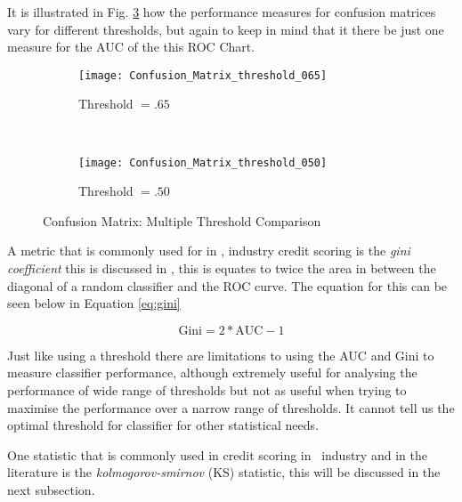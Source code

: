 It is illustrated in Fig. \ref{fig:matric_compare} how the performance measures for confusion matrices vary for different thresholds, but again to keep in mind that it there be just one measure for the AUC of the this ROC Chart.   

\begin{figure}[H]
	\centering
	\begin{subfigure}[b]{0.45\textwidth}
		\captionsetup{font=scriptsize}
		\texttt{[image: Confusion\_Matrix\_threshold\_065]}
		\caption{Threshold $=.65$}\label{fig:Threshold65}
	\end{subfigure} ~\quad
	\begin{subfigure}[b]{0.45\textwidth}
		\captionsetup{font=scriptsize}
		\texttt{[image: Confusion\_Matrix\_threshold\_050]}
		\caption{Threshold $=.50$}\label{fig:Threshold50}
	\end{subfigure}
	\caption{Confusion Matrix: Multiple Threshold Comparison}
	\label{fig:matric_compare}
\end{figure}

A metric that is commonly used for in \subjectname, industry credit scoring is the \textit{gini coefficient} this is discussed in \citep{hand_good_2005}, this is equates to twice the area in between the diagonal of a random classifier and the ROC curve. The equation for this can be seen below in Equation \ref{eq:gini}

\begin{equation} \label{eq:gini}
\text{Gini} = 2*\text{AUC} - 1
\end{equation}

Just like using a threshold there are limitations to using the AUC and Gini to measure classifier performance, although extremely useful for analysing the performance of wide range of thresholds but not as useful when trying to maximise the performance over a narrow range of thresholds. It cannot tell us the optimal threshold for classifier for  other statistical needs.

One statistic that is commonly used in credit scoring in \subjectname\, industry and in the literature is the \textit{kolmogorov-smirnov} (KS) statistic, this will be discussed in the next subsection.
	

